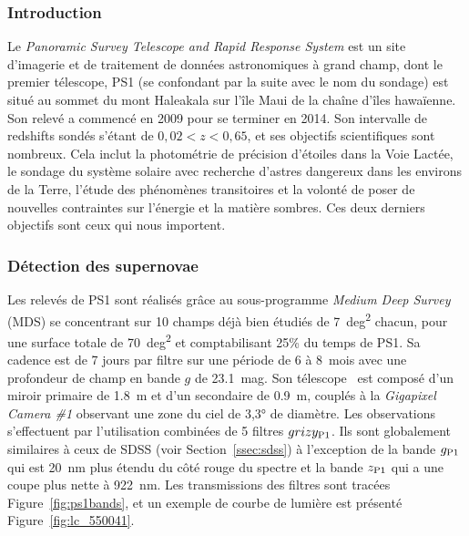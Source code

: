\documentclass[../main/main.tex]{subfiles}
\begin{document}
\subsubsection{Introduction}\label{sssec:ps1intro}

Le \textit{Panoramic Survey Telescope and Rapid Response System}
\citep[Pan-STARRS,][]{chambers2016, scolnic2018} est un site d'imagerie et de
traitement de données astronomiques à grand champ, dont le premier télescope,
PS1 (se confondant par la suite avec le nom du sondage) est situé au sommet du
mont Haleakala sur l'île Maui de la chaîne d'îles hawaïenne. Son relevé a
commencé en 2009 pour se terminer en 2014. Son intervalle de redshifts sondés
s'étant de $0,02 < z < 0,65$, et ses objectifs scientifiques sont nombreux. Cela
inclut la photométrie de précision d'étoiles dans la Voie Lactée, le sondage du
système solaire avec recherche d'astres dangereux dans les environs de la Terre,
l'étude des phénomènes transitoires et la volonté de poser de nouvelles
contraintes sur l'énergie et la matière sombres. Ces deux derniers objectifs
sont ceux qui nous importent. 

\subsubsection{Détection des supernovae}\label{sssec:ps1detec}

Les relevés de PS1 sont réalisés grâce au sous-programme \textit{Medium Deep
Survey} (MDS) se concentrant sur 10 champs déjà bien étudiés de \SI{7}{deg^2}
chacun, pour une surface totale de \SI{70}{deg^2} et comptabilisant 25\% du
temps de PS1. Sa cadence est de 7 jours par filtre sur une période de 6 à
\SI{8}{mois} avec une profondeur de champ en bande $g$ de \SI{23,1}{mag}. Son
télescope~\citep{hodapp2004} est composé d'un miroir primaire de \SI{1,8}{m} et
d'un secondaire de \SI{0,9}{m}, couplés à la \textit{Gigapixel Camera \#1}
\citep[GPC1,][]{kaiser2010, tonry2006} observant une zone du ciel de \ang{3,3;;}
de diamètre. Les observations s'effectuent par l'utilisation combinées de 5
filtres $grizy_{\rm P1}$. Ils sont globalement similaires à ceux de SDSS (voir
Section~\ref{ssec:sdss}) à l'exception de la bande $g_{\rm P1}$ qui est
\SI{20}{nm} plus étendu du côté rouge du spectre et la bande $z_{\rm P1}$ qui a
une coupe plus nette à \SI{922}{nm}. Les transmissions des filtres sont tracées
Figure~\ref{fig:ps1bands}, et un exemple de courbe de lumière est présenté
Figure~\ref{fig:lc_550041}.
\end{document}
